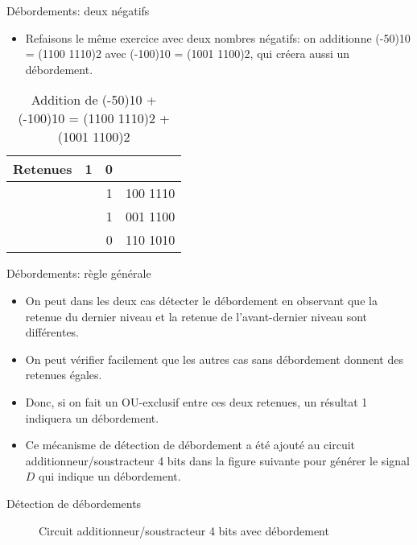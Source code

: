 \documentclass[presentation]{beamer}
\begin{document}
\begin{frame}[label={sec:org0cb6377}]{Débordements: deux négatifs}
\begin{itemize}
\item Refaisons le même exercice avec deux nombres négatifs: on additionne (-50)10 = (1100 1110)2 avec (-100)10 = (1001 1100)2, qui créera aussi un débordement.
\end{itemize}

\begin{table}[htbp]
\caption{\label{tab:orge71bfdf}Addition de (-50)10 + (-100)10 = (1100 1110)2 + (1001 1100)2}
\centering
\begin{tabular}{lrrl}
Retenues & 1 & 0 & \\
\hline
 &  & 1 & 100 1110\\
 &  & 1 & 001 1100\\
\hline
 &  & 0 & 110 1010\\
\end{tabular}
\end{table}
\end{frame}

\begin{frame}[label={sec:org7eaaf61}]{Débordements: règle générale}
\begin{itemize}
\item On peut dans les deux cas détecter le débordement en observant que la retenue du dernier niveau et la retenue de l'avant-dernier niveau sont différentes.

\item On peut vérifier facilement que les autres cas sans débordement donnent des retenues égales.

\item Donc, si on fait un OU-exclusif entre ces deux retenues, un résultat 1 indiquera un débordement.

\item Ce mécanisme de détection de débordement a été ajouté au circuit additionneur/soustracteur 4 bits dans la figure suivante pour générer le signal \(D\) qui indique un débordement.
\end{itemize}
\end{frame}

\begin{frame}[label={sec:org1ae69ef}]{Détection de débordements}
\begin{figure}[htbp]
\centering

\caption{\label{fig:org9921479}Circuit additionneur/soustracteur 4 bits avec débordement}
\end{figure}
\end{frame}
\end{document}
